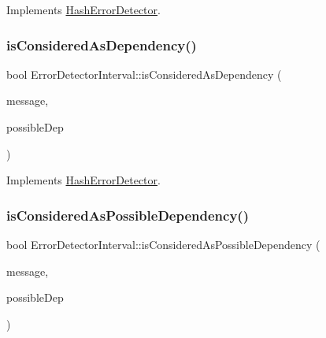 Implements \hyperlink{classHashErrorDetector_a5b9f7e8a6f63b1582e912102021c2d8d}{Hash\+Error\+Detector}.

\mbox{\label{classErrorDetectorInterval_a27cb3ca9d7e5c3ddda9ee5ee66f182ed}} 
\subsubsection{\texorpdfstring{is\+Considered\+As\+Dependency()}{isConsideredAsDependency()}}
{\footnotesize\ttfamily bool Error\+Detector\+Interval\+::is\+Considered\+As\+Dependency (\begin{DoxyParamCaption}\item[{const \hyperlink{structures_8h_a7e7bdc1d2fff8a9436f2f352b2711ed6}{message\+Info} \&}]{message,  }\item[{const \hyperlink{structures_8h_a7e7bdc1d2fff8a9436f2f352b2711ed6}{message\+Info} \&}]{possible\+Dep }\end{DoxyParamCaption})\hspace{0.3cm}{\ttfamily [virtual]}}



Implements \hyperlink{classHashErrorDetector_a4693d4d5e327b19f75088cef52bcad7d}{Hash\+Error\+Detector}.

\mbox{\label{classErrorDetectorInterval_a33bf470042fb65d833fd0f091374a046}} 
\subsubsection{\texorpdfstring{is\+Considered\+As\+Possible\+Dependency()}{isConsideredAsPossibleDependency()}}
{\footnotesize\ttfamily bool Error\+Detector\+Interval\+::is\+Considered\+As\+Possible\+Dependency (\begin{DoxyParamCaption}\item[{const \hyperlink{structures_8h_a7e7bdc1d2fff8a9436f2f352b2711ed6}{message\+Info} \&}]{message,  }\item[{const \hyperlink{structures_8h_a7e7bdc1d2fff8a9436f2f352b2711ed6}{message\+Info} \&}]{possible\+Dep }\end{DoxyParamCaption})\hspace{0.3cm}{\ttfamily [virtual]}}



